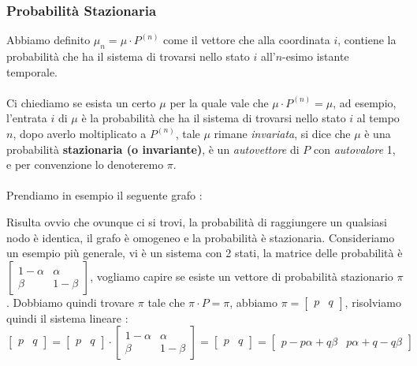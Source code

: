 \documentclass[12pt, letterpaper]{article}
\newcommand{\acc}{\\\hphantom{}\\}
\begin{document}
\subsubsection{Probabilità Stazionaria}
Abbiamo definito \(\mu_n = \mu \cdot P^{(n)}\) come il vettore che 
alla coordinata \(i\), contiene la probabilità che ha il sistema di trovarsi nello stato \(i\)
all'\(n\)-esimo istante temporale.\acc Ci chiediamo se esista un certo \(\mu\) per la quale vale 
che \(\mu\cdot P^{(n)}=\mu\), ad esempio, l'entrata \(i\) di \(\mu\) è la probabilità che ha il sistema di trovarsi nello 
stato \(i\) al tempo \(n\), dopo averlo moltiplicato a \(P^{(n)}\), tale \(\mu\) rimane \textit{invariata}, si dice 
che \(\mu\) è una probabilità \textbf{stazionaria (o invariante)}, è un \textit{autovettore} di \(P\) con 
\textit{autovalore} 1, e per convenzione lo denoteremo \(\pi\).\acc 
Prendiamo in esempio il seguente grafo : \begin{figure}[h]
\end{figure}
Risulta ovvio che ovunque ci si trovi, la probabilità di raggiungere un qualsiasi nodo è identica, il grafo è 
omogeneo e la probabilità è stazionaria. Consideriamo un esempio più generale, vi è un sistema con 2 stati, 
la matrice delle probabilità è \(\begin{bmatrix}1-\alpha&\alpha\\\beta&1-\beta\end{bmatrix}\), vogliamo capire 
se esiste un vettore di probabilità stazionario \(\pi\). Dobbiamo quindi trovare \(\pi\) tale che 
\(\pi\cdot P =\pi\), abbiamo \(\pi = \begin{bmatrix}
    p&q
\end{bmatrix}\), risolviamo quindi il sistema lineare : 
$$\begin{bmatrix}p&q\end{bmatrix}=\begin{bmatrix}p&q\end{bmatrix}\cdot\begin{bmatrix}1-\alpha&\alpha\\\beta&1-\beta\end{bmatrix}=
\begin{bmatrix}p&q\end{bmatrix}=\begin{bmatrix}p-p\alpha+q\beta&p\alpha+q-q\beta\end{bmatrix}$$
\end{document}
